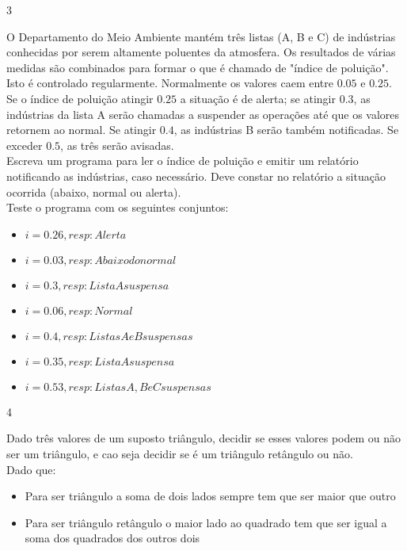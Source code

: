 \begin{exercicio}
  {3}
  {O Departamento do Meio Ambiente mantém três listas (A, B e C) de indústrias conhecidas por serem altamente poluentes da atmosfera. Os resultados de várias medidas são combinados para formar o que é chamado de "índice de poluição". Isto é controlado regularmente. Normalmente os valores caem entre $0.05$ e $0.25$. Se o índice de poluição atingir $0.25$ a situação é de alerta; se atingir $0.3$, as indústrias da lista A serão chamadas a suspender as operações até que os valores retornem ao normal. Se atingir $0.4$, as indústrias B serão também notificadas. Se exceder $0.5$, as três serão avisadas. \\
  Escreva um programa para ler o índice de poluição e emitir um relatório notificando as indústrias, caso necessário. Deve constar no relatório a situação ocorrida (abaixo, normal ou alerta). \\
  Teste o programa com os seguintes conjuntos: \\
  \begin{itemize}
    \item $i = 0.26, resp: Alerta$
    \item $i = 0.03, resp: Abaixo do normal$
    \item $i = 0.3, resp: Lista A suspensa$
    \item $i = 0.06, resp: Normal$
    \item $i = 0.4, resp: Listas A e B suspensas$
    \item $i = 0.35, resp: Lista A suspensa$
    \item $i = 0.53, resp: Listas A, B e C suspensas$
  \end{itemize}}
\end{exercicio}

\begin{exercicio}
  {4}
  {Dado três valores de um suposto triângulo, decidir se esses valores podem ou não ser um triângulo, e cao seja decidir se é um triângulo retângulo ou não. \\
  Dado que: \\
  \begin{itemize}
    \item Para ser triângulo a soma de dois lados sempre tem que ser maior que outro
    \item Para ser triângulo retângulo o maior lado ao quadrado tem que ser igual a soma dos quadrados dos outros dois
  \end{itemize}}
\end{exercicio}


